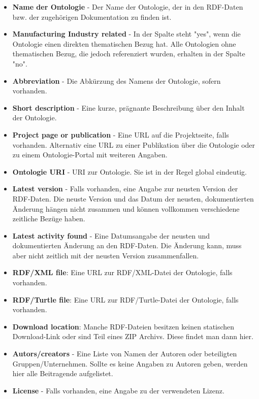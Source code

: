 \documentclass{article}
\begin{document}
\begin{itemize}
    \item \textbf{Name der Ontologie} - Der Name der Ontologie, der in den RDF-Daten bzw. der zugehörigen Dokumentation zu finden ist.
    \item \textbf{Manufacturing Industry related} - In der Spalte steht "yes", wenn die Ontologie einen direkten thematischen Bezug hat. Alle Ontologien ohne thematischen Bezug, die jedoch referenziert wurden, erhalten in der Spalte "no".
    \item \textbf{Abbreviation} - Die Abkürzung des Namens der Ontologie, sofern vorhanden.
    \item \textbf{Short description} - Eine kurze, prägnante Beschreibung über den Inhalt der Ontologie.
    \item \textbf{Project page or publication} - Eine URL auf die Projektseite, falls vorhanden. Alternativ eine URL zu einer Publikation über die Ontologie oder zu einem Ontologie-Portal mit weiteren Angaben.
    \item \textbf{Ontologie URI} - URI zur Ontologie. Sie ist in der Regel global eindeutig.
    \item \textbf{Latest version} - Falls vorhanden, eine Angabe zur neusten Version der RDF-Daten. Die neuste Version und das Datum der neusten, dokumentierten Änderung hängen nicht zusammen und können vollkommen verschiedene zeitliche Bezüge haben.
    \item \textbf{Latest activity found} - Eine Datumsangabe der neusten und dokumentierten Änderung an den RDF-Daten. Die Änderung kann, muss aber nicht zeitlich mit der neusten Version zusammenfallen.
    \item \textbf{RDF/XML file}: Eine URL zur RDF/XML-Datei der Ontologie, falls vorhanden.
    \item \textbf{RDF/Turtle file}: Eine URL zur RDF/Turtle-Datei der Ontologie, falls vorhanden.
    \item \textbf{Download location}: Manche RDF-Dateien besitzen keinen statischen Download-Link oder sind Teil eines ZIP Archivs. Diese findet man dann hier.
    \item \textbf{Autors/creators} - Eine Liste von Namen der Autoren oder beteiligten Gruppen/Unternehmen. Sollte es keine Angaben zu Autoren geben, werden hier alle Beitragende aufgelistet.
    \item \textbf{License} - Falls vorhanden, eine Angabe zu der verwendeten Lizenz.
\end{itemize}
\end{document}
